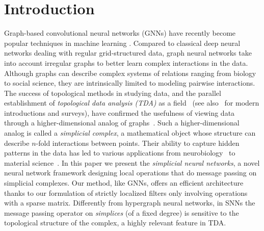 \section{Introduction}



Graph-based convolutional neural networks (GNNs) have recently become popular techniques in machine learning . Compared to classical deep neural networks dealing with regular grid-structured data, graph neural networks take into account irregular graphs to better learn complex interactions in the data. Although graphs can describe complex systems of relations ranging from biology to social science, they are intrinsically limited to modeling pairwise interactions. 
The success of topological methods in studying data, and the parallel establishment of \emph{topological data analysis (TDA)} as a field~\cite{edelsbrunner2000topological, zomorodian2005computing} (see also~\cite{carlsson2008,chazal2017,edelsbrunner2010computational,ghrist2008barcodes} for modern introductions and surveys), have confirmed the usefulness of viewing data through a higher-dimensional analog of graphs~\cite{moore2012,patania2017}. Such a higher-dimensional analog is called a \emph{simplicial complex}, a mathematical object whose structure can  describe $n$-fold interactions between points. Their ability to capture hidden patterns in the data has led to various applications from neurobiology~\cite{giusti2015,reimann2017} to material science~\cite{hiraoka2016}.
In this paper we present the \textit{simplicial neural networks}, a novel neural network framework designing local operations that do message passing on simplicial complexes.
Our method, like GNNs, offers an efficient architecture thanks to our formulation of strictly localized filters only involving operations with a sparse matrix. 
Differently from hypergraph neural networks, in SNNs the message passing operator on \emph{simplices} (of a fixed degree) is sensitive to the topological structure of the complex, a highly relevant feature in TDA. 





















